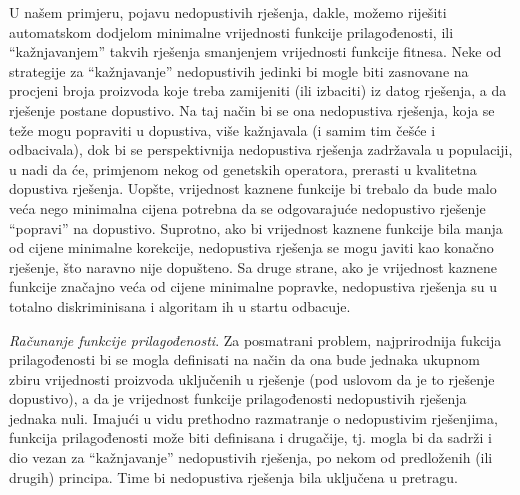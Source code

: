 \documentclass[a4paper, utf8, 11pt, colorlinks]{book}
\begin{document}
U našem primjeru, pojavu nedopustivih rješenja, dakle, možemo riješiti automatskom dodjelom minimalne vrijednosti funkcije prilagođenosti, ili ``kažnjavanjem'' takvih rješenja smanjenjem vrijednosti funkcije fitnesa. Neke od strategije za ``kažnjavanje'' nedopustivih jedinki bi mogle biti zasnovane na procjeni broja proizvoda koje treba zamijeniti (ili izbaciti) iz datog rješenja, a da rješenje postane dopustivo. Na taj način bi se ona nedopustiva rješenja, koja se teže mogu popraviti u dopustiva, više kažnjavala (i samim tim češće i odbacivala), dok bi se perspektivnija nedopustiva rješenja zadržavala u populaciji, u nadi da će, primjenom nekog od genetskih operatora, prerasti u kvalitetna dopustiva rješenja. Uopšte, vrijednost kaznene funkcije bi trebalo da bude malo veća nego minimalna cijena potrebna da se odgovarajuće nedopustivo rješenje ``popravi'' na dopustivo. Suprotno, ako bi vrijednost kaznene funkcije bila manja od cijene minimalne korekcije, nedopustiva rješenja se mogu javiti kao konačno rješenje, što naravno nije dopušteno. Sa druge strane, ako je vrijednost kaznene funkcije značajno veća od cijene minimalne popravke, nedopustiva rješenja su u totalno diskriminisana i algoritam ih u startu odbacuje. 

\emph{Računanje funkcije prilagođenosti}. Za posmatrani problem, najprirodnija fukcija prilagođenosti bi se mogla definisati na način da ona bude jednaka ukupnom zbiru vrijednosti proizvoda uključenih u rješenje (pod uslovom da je to rješenje dopustivo), a da je vrijednost funkcije prilagođenosti  nedopustivih rješenja   jednaka nuli. 
Imajući u vidu prethodno razmatranje o nedopustivim rješenjima, funkcija prilagođenosti može biti definisana i drugačije, tj. mogla bi da sadrži i dio vezan za  ``kažnjavanje'' nedopustivih rješenja, po nekom od predloženih (ili drugih) principa. Time bi nedopustiva rješenja bila uključena u pretragu.
\end{document}
